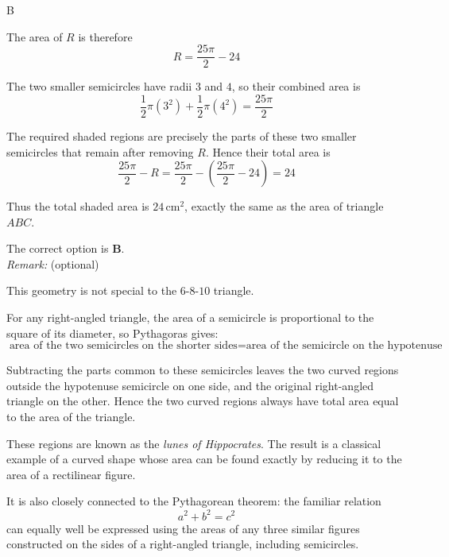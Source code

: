 \documentclass[11pt,a4paper]{article}
\begin{document}
\begin{enumerate}[label=\textbf{\arabic*.},leftmargin=*,itemsep=0pt,start=7]
\begin{djsSolution}{B}
\begin{djsSolutionFigure}
\end{djsSolutionFigure}

The area of \(R\) is therefore
\[
R=\frac{25\pi}{2}-24
\]

The two smaller semicircles have radii \(3\) and \(4\), so their combined area is
\[
\frac12\pi(3^2)+\frac12\pi(4^2)
=\frac{25\pi}{2}
\]

The required shaded regions are precisely the parts of these two smaller semicircles that remain after removing \(R\). Hence their total area is
\[
\frac{25\pi}{2}-R
=\frac{25\pi}{2}-\left(\frac{25\pi}{2}-24\right)
=24
\]

Thus the total shaded area is \(24\,\mathrm{cm}^2\), exactly the same as the area of triangle \(ABC\).

The correct option is \textbf{B}. \\

\textit{Remark:} (optional)

This geometry is not special to the \(6\)-\(8\)-\(10\) triangle. 

For any right-angled triangle, the area of a semicircle is proportional to the square of its diameter, so Pythagoras gives:
\[
\text{area of the two semicircles on the shorter sides}
=
\text{area of the semicircle on the hypotenuse}
\]

Subtracting the parts common to these semicircles leaves the two curved regions outside the hypotenuse semicircle on one side, and the original right-angled triangle on the other. Hence the two curved regions always have total area equal to the area of the triangle.

These regions are known as the \emph{lunes of Hippocrates}. The result is a classical example of a curved shape whose area can be found exactly by reducing it to the area of a rectilinear figure. 

It is also closely connected to the Pythagorean theorem: the familiar relation
\[
a^2+b^2=c^2
\]
can equally well be expressed using the areas of any three similar figures constructed on the sides of a right-angled triangle, including semicircles.
\end{djsSolution}
\end{enumerate}
\end{document}
